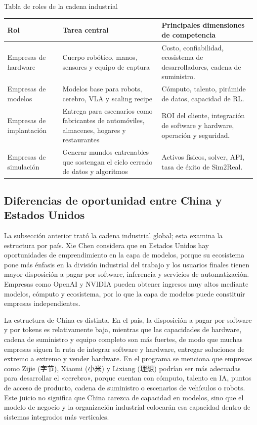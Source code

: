 \documentclass[a4paper]{article}
\begin{document}
\begin{knowledgebox}{Tabla de roles de la cadena industrial}
\begin{tabularx}{\textwidth}{p{}p{}X}
\toprule
Rol & Tarea central & Principales dimensiones de competencia \\
\midrule
Empresas de hardware & Cuerpo robótico, manos, sensores y equipo de captura & Costo, confiabilidad, ecosistema de desarrolladores, cadena de suministro. \\
Empresas de modelos & Modelos base para robots, cerebro, VLA y scaling recipe & Cómputo, talento, pirámide de datos, capacidad de RL. \\
Empresas de implantación & Entrega para escenarios como fabricantes de automóviles, almacenes, hogares y restaurantes & ROI del cliente, integración de software y hardware, operación y seguridad. \\
Empresas de simulación & Generar mundos entrenables que sostengan el ciclo cerrado de datos y algoritmos & Activos físicos, solver, API, tasa de éxito de Sim2Real. \\
\bottomrule
\end{tabularx}
\end{knowledgebox}

\subsection{Diferencias de oportunidad entre China y Estados Unidos}

La subsección anterior trató la cadena industrial global; esta examina la estructura por país. Xie Chen considera que en Estados Unidos hay oportunidades de emprendimiento en la capa de modelos, porque su ecosistema pone más énfasis en la división industrial del trabajo y los usuarios finales tienen mayor disposición a pagar por software, inferencia y servicios de automatización. Empresas como OpenAI y NVIDIA pueden obtener ingresos muy altos mediante modelos, cómputo y ecosistema, por lo que la capa de modelos puede constituir empresas independientes.

La estructura de China es distinta. En el país, la disposición a pagar por software y por tokens es relativamente baja, mientras que las capacidades de hardware, cadena de suministro y equipo completo son más fuertes, de modo que muchas empresas siguen la ruta de integrar software y hardware, entregar soluciones de extremo a extremo y vender hardware. En el programa se menciona que empresas como Zijie (字节), Xiaomi (小米) y Lixiang (理想) podrían ser más adecuadas para desarrollar el «cerebro», porque cuentan con cómputo, talento en IA, puntos de acceso de producto, cadena de suministro o escenarios de vehículos o robots. Este juicio no significa que China carezca de capacidad en modelos, sino que el modelo de negocio y la organización industrial colocarán esa capacidad dentro de sistemas integrados más verticales.
\end{document}
